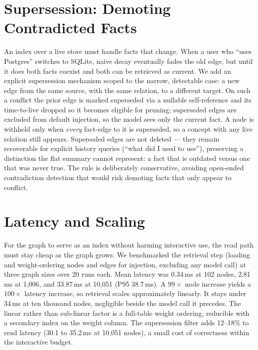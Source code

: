 \documentclass[11pt]{article}
\begin{document}
\section{Supersession: Demoting Contradicted Facts}
\label{sec:temporal}

An index over a live store must handle facts that change. When a user who ``uses Postgres'' switches to SQLite, naive decay eventually fades the old edge, but until it does both facts coexist and both can be retrieved as current. We add an explicit supersession mechanism scoped to the narrow, detectable case: a new edge from the same source, with the same relation, to a different target. On such a conflict the prior edge is marked superseded via a nullable self-reference and its time-to-live dropped so it becomes eligible for pruning; superseded edges are excluded from default injection, so the model sees only the current fact. A node is withheld only when \emph{every} fact-edge to it is superseded, so a concept with any live relation still appears. Superseded edges are not deleted --- they remain recoverable for explicit history queries (``what did I used to use''), preserving a distinction the flat summary cannot represent: a fact that is outdated versus one that was never true. The rule is deliberately conservative, avoiding open-ended contradiction detection that would risk demoting facts that only appear to conflict.

\section{Latency and Scaling}
\label{sec:latency}

For the graph to serve as an index without harming interactive use, the read path must stay cheap as the graph grows. We benchmarked the retrieval step (loading and weight-ordering nodes and edges for injection, excluding any model call) at three graph sizes over 20 runs each. Mean latency was 0.34\,ms at 102 nodes, 2.81\,ms at 1{,}006, and 33.87\,ms at 10{,}051 (P95 38.7\,ms). A $99\times$ node increase yields a $100\times$ latency increase, so retrieval scales approximately linearly. It stays under 34\,ms at ten thousand nodes, negligible beside the model call it precedes. The linear rather than sub-linear factor is a full-table weight ordering, reducible with a secondary index on the weight column. The supersession filter adds 12--18\% to read latency (30.1 to 35.2\,ms at 10{,}051 nodes), a small cost of correctness within the interactive budget.
\end{document}
